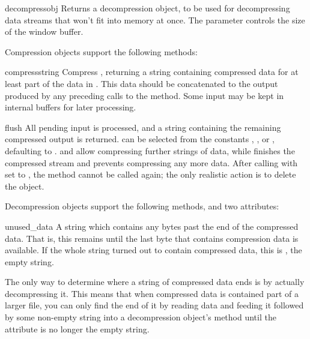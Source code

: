 \begin{funcdesc}{decompressobj}{}
  Returns a decompression object, to be used for decompressing data
  streams that won't fit into memory at once.  The 
  parameter controls the size of the window buffer.
\end{funcdesc}

Compression objects support the following methods:

\begin{methoddesc}[Compress]{compress}{string}
Compress , returning a string containing compressed data
for at least part of the data in .  This data should be
concatenated to the output produced by any preceding calls to the
 method.  Some input may be kept in internal buffers
for later processing.
\end{methoddesc}

\begin{methoddesc}[Compress]{flush}{}
All pending input is processed, and a string containing the remaining
compressed output is returned.   can be selected from the
constants ,  ,  or 
, defaulting to .   and 
 allow compressing further strings of data, while
 finishes the compressed stream and 
prevents compressing any more data.  After calling
 with  set to , the
 method cannot be called again; the only realistic
action is to delete the object.  
\end{methoddesc}

Decompression objects support the following methods, and two attributes:

\begin{memberdesc}{unused_data}
A string which contains any bytes past the end of the compressed data.
That is, this remains  until the last byte that contains
compression data is available.  If the whole string turned out to
contain compressed data, this is , the empty string.

The only way to determine where a string of compressed data ends is by
actually decompressing it.  This means that when compressed data is
contained part of a larger file, you can only find the end of it by
reading data and feeding it followed by some non-empty string into a
decompression object's  method until the
 attribute is no longer the empty string.
\end{memberdesc}

